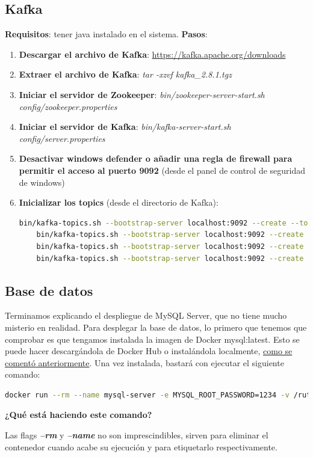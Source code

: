 \documentclass[a4paper,12pt]{article}
\begin{document}
\subsection{Kafka}
\label{sec:kafka}
\textbf{Requisitos}: tener java instalado en el sistema.
\textbf{Pasos}:
\begin{enumerate}
  \item \textbf{Descargar el archivo de Kafka}: \href{https://kafka.apache.org/downloads}{https://kafka.apache.org/downloads}
  \item \textbf{Extraer el archivo de Kafka}: \textit{tar -xzvf kafka\_2.8.1.tgz}
  \item \textbf{Iniciar el servidor de Zookeeper}: \textit{bin/zookeeper-server-start.sh config/zookeeper.properties}
  \item \textbf{Iniciar el servidor de Kafka}: \textit{bin/kafka-server-start.sh config/server.properties}
  \item \textbf{Desactivar windows defender o añadir una regla de firewall para permitir el acceso al puerto 9092}
        (desde el panel de control de seguridad de windows)
  \item \textbf{Inicializar los topics} (desde el directorio de Kafka):
        \begin{lstlisting}[language=bash]
    bin/kafka-topics.sh --bootstrap-server localhost:9092 --create --topic customer_responses &&
    bin/kafka-topics.sh --bootstrap-server localhost:9092 --create --topic taxi_responses &&
    bin/kafka-topics.sh --bootstrap-server localhost:9092 --create --topic map_responses &&
    bin/kafka-topics.sh --bootstrap-server localhost:9092 --create --topic requests
    \end{lstlisting}
\end{enumerate}
\subsection{Base de datos}
Terminamos explicando el despliegue de MySQL Server, que no tiene mucho misterio en realidad. Para desplegar la base de datos, lo
primero que tenemos que comprobar es que tengamos instalada la imagen de Docker mysql:latest. Esto se puede hacer descargándola
de Docker Hub o instalándola localmente, \hyperref[sec:componentes_docker]{como se comentó anteriormente}. Una vez instalada, bastará con
ejecutar el siguiente comando:
\begin{lstlisting}[language=bash]
  docker run --rm --name mysql-server -e MYSQL_ROOT_PASSWORD=1234 -v /ruta/initialize.sql:/docker-entrypoint-initdb.d/script.sql -p 3306:3306 mysql:latest
\end{lstlisting}
\textbf{¿Qué está haciendo este comando?} \par
Las flags \textbf{\textit{--rm}} y \textbf{\textit{--name}} no son imprescindibles, sirven para eliminar el contenedor cuando acabe su ejecución y para
etiquetarlo respectivamente. \par
\end{document}
